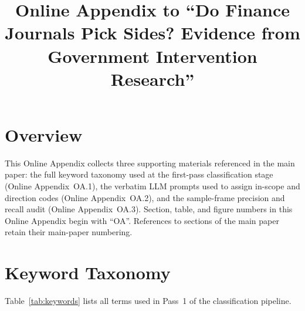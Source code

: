 \documentclass[12pt]{article}
\title{Online Appendix to ``Do Finance Journals Pick Sides? Evidence from Government Intervention Research''}
\author{}
\date{}
\begin{document}
\maketitle

\section*{Overview}

This Online Appendix collects three supporting materials referenced in the main paper:
the full keyword taxonomy used at the first-pass classification stage
(Online Appendix~OA.1), the verbatim LLM prompts used to assign in-scope
and direction codes (Online Appendix~OA.2), and the sample-frame
precision and recall audit (Online Appendix~OA.3).  Section, table, and
figure numbers in this Online Appendix begin with ``OA''.  References to
sections of the main paper retain their main-paper numbering.

\renewcommand{\thesection}{OA.\arabic{section}}
\setcounter{section}{0}
\renewcommand{\thetable}{OA.\arabic{table}}
\setcounter{table}{0}

\section{Keyword Taxonomy}

Table~\ref{tab:keywords} lists all terms used in Pass~1 of the classification
pipeline.
\end{document}
